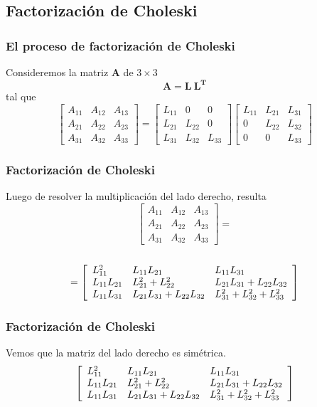 \subsection{Factorización de Choleski}
\begin{frame}
\frametitle{El proceso de factorización de Choleski}
Consideremos la matriz $\mathbf{A}$ de $3 \times 3$
\[\mathbf{A = L \: L^{T}}\]
tal que
\[ \begin{bmatrix}
		A_{11} & A_{12} & A_{13} \\
		A_{21} & A_{22} & A_{23} \\
		A_{31} & A_{32} & A_{33}
	\end{bmatrix}
	= \begin{bmatrix}
		L_{11} & 0      & 0 \\
		L_{21} & L_{22} & 0 \\
		L_{31} & L_{32} & L_{33}
	\end{bmatrix}
	\begin{bmatrix}
		L_{11} & L_{21} & L_{31} \\
		0      & L_{22} & L_{32} \\
		0      & 0      & L_{33}
	\end{bmatrix} \]
\end{frame}
\begin{frame}[fragile]
\frametitle{Factorización de Choleski}
Luego de resolver la multiplicación del lado derecho, resulta
\fontsize{12}{12}\selectfont
\[ 
	\begin{bmatrix}
		A_{11} & A_{12} & A_{13} \\
		A_{21} & A_{22} & A_{23} \\
		A_{31} & A_{32} & A_{33}
	\end{bmatrix} = \]
\\
\[ =
	\left [ \begin{array}{l l l}
		L_{11}^{2} & L_{11}L_{21} & L_{11}L_{31} \\
		L_{11}L_{21} & L_{21}^{2} + L_{22}^{2} & L_{21}L_{31} + L_{22}L_{32} \\
		L_{11}L_{31} & L_{21}L_{31} + L_{22}L_{32} & L_{31}^{2} + L_{32}^{2} + L_{33}^{2}
	\end{array} \right]  \]
\end{frame}
\begin{frame}[fragile]
\frametitle{Factorización de Choleski}
Vemos que la matriz del lado derecho es simétrica.
\fontsize{12}{12}\selectfont
\[
	\left [ \begin{array}{l l l}
		L_{11}^{2} & L_{11}L_{21} & L_{11}L_{31} \\
		L_{11}L_{21} & L_{21}^{2} + L_{22}^{2} & L_{21}L_{31} + L_{22}L_{32} \\
		L_{11}L_{31} & L_{21}L_{31} + L_{22}L_{32} & L_{31}^{2} + L_{32}^{2} + L_{33}^{2}
	\end{array} \right]  \]
\end{frame}
